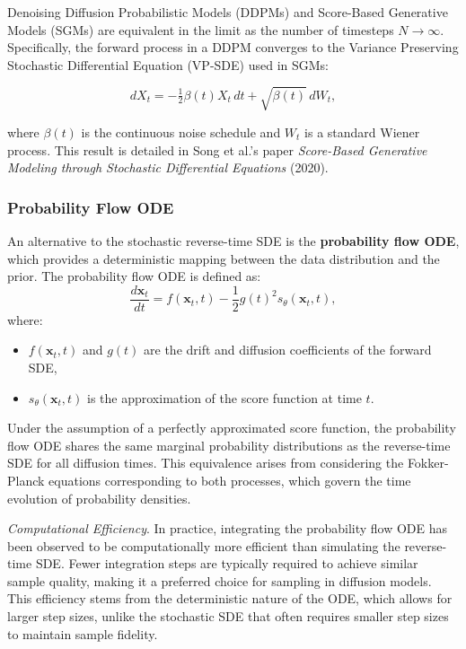 Denoising Diffusion Probabilistic Models (DDPMs) and Score-Based Generative Models (SGMs) are equivalent in the limit as the number of timesteps \( N \to \infty \). Specifically, the forward process in a DDPM converges to the Variance Preserving Stochastic Differential Equation (VP-SDE) used in SGMs:

\[
dX_t = -\tfrac{1}{2} \beta(t) X_t \, dt + \sqrt{\beta(t)} \, dW_t,
\]

where \( \beta(t) \) is the continuous noise schedule and \( W_t \) is a standard Wiener process. This result is detailed in Song et al.'s paper \textit{Score-Based Generative Modeling through Stochastic Differential Equations} (2020).

\subsubsection{Probability Flow ODE}

An alternative to the stochastic reverse-time SDE is the \textbf{probability flow ODE}, which provides a deterministic mapping between the data distribution and the prior. The probability flow ODE is defined as:
\[
\frac{d\mathbf{x}_t}{dt} = f(\mathbf{x}_t, t) - \frac{1}{2} g(t)^2 s_\theta(\mathbf{x}_t, t),
\]
where:
\begin{itemize}
    \item \( f(\mathbf{x}_t, t) \) and \( g(t) \) are the drift and diffusion coefficients of the forward SDE,
    \item \( s_\theta(\mathbf{x}_t, t) \) is the approximation of the score function at time \(t\).
\end{itemize}

Under the assumption of a perfectly approximated score function, the probability flow ODE shares the same marginal probability distributions as the reverse-time SDE for all diffusion times. This equivalence arises from considering the Fokker-Planck equations corresponding to both processes, which govern the time evolution of probability densities.

\textit{Computational Efficiency}. In practice, integrating the probability flow ODE has been observed to be computationally more efficient than simulating the reverse-time SDE. Fewer integration steps are typically required to achieve similar sample quality, making it a preferred choice for sampling in diffusion models. This efficiency stems from the deterministic nature of the ODE, which allows for larger step sizes, unlike the stochastic SDE that often requires smaller step sizes to maintain sample fidelity.

